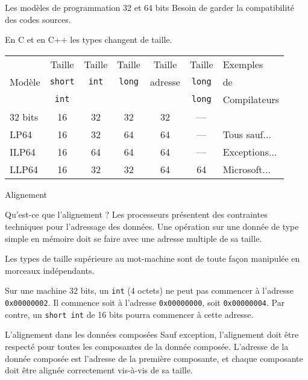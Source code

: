 \begin{frame}{Les modèles de programmation 32 et 64 bits}
  Besoin de garder la compatibilité des codes sources.

  En C et en C++ les types changent de taille.
  \begin{center}
    \begin{tabular}{l|ccccc|l}
      &Taille&Taille&Taille&Taille&Taille&Exemples\\
      Modèle&\texttt{short}&\texttt{int}&\texttt{long}&adresse&\texttt{long}&de\\
      &\texttt{int}&&&&\texttt{long}&Compilateurs\\\hline
      32 bits&16&32&32&32&---&\\\hline
      LP64&16&32&64&64&---&Tous sauf...\\\hline
      ILP64&16&64&64&64&---&Exceptions...\\\hline
      LLP64&16&32&32&64&64&Microsoft...
    \end{tabular}
  \end{center}
\end{frame}
\begin{frame}{Alignement}
  \begin{block}{Qu'est-ce que l'alignement ?}
    Les processeurs présentent des contraintes techniques pour l'adressage des
    données. Une opération sur une donnée de type simple en mémoire doit se
    faire avec une adresse multiple de sa taille.

    Les types de taille supérieure au mot-machine sont de toute façon
    manipulée en morceaux indépendants.
  \end{block}

  \begin{example}
    Sur une machine 32 bits, un \texttt{int} (4 octets) ne peut pas commencer
    à l'adresse \texttt{0x00000002}. Il commence soit à l'adresse
    \texttt{0x00000000}, soit \texttt{0x00000004}. Par contre, un
    \texttt{short int} de 16 bits pourra commencer à cette adresse.
  \end{example}
\end{frame}
\begin{frame}{L'alignement dans les données composées}
  Sauf exception, l'alignement doit être respecté pour toutes les composantes
  de la donnée composée. L'adresse de la donnée composée est l'adresse de la
  première composante, et chaque composante doit être alignée correctement
  vis-à-vis de sa taille.
\end{frame}
